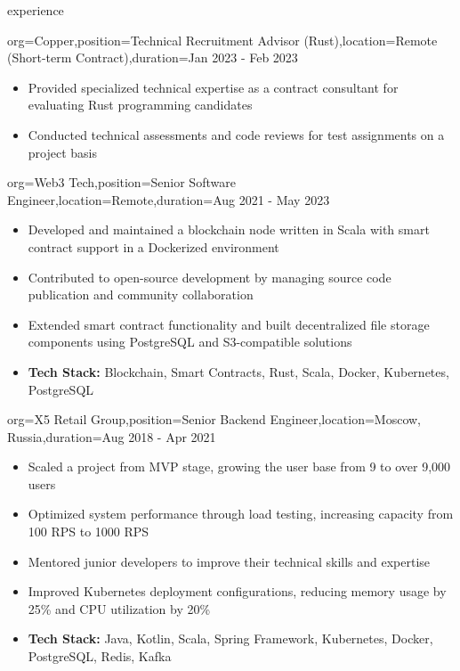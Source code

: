 \documentclass{resume}
\begin{document}
\begin{ResumeSection}{experience}
    \begin{ResumeSubsection}{org=Copper,position=Technical Recruitment Advisor (Rust),location=Remote (Short-term Contract),duration=Jan 2023 - Feb 2023}
        \begin{itemize}
            \item Provided specialized technical expertise as a contract consultant for evaluating Rust programming candidates
            \item Conducted technical assessments and code reviews for test assignments on a project basis
        \end{itemize}
    \end{ResumeSubsection}

    \begin{ResumeSubsection}{org=Web3 Tech,position=Senior Software Engineer,location=Remote,duration=Aug 2021 - May 2023}
    \begin{itemize}
        \item Developed and maintained a blockchain node written in Scala with smart contract support in a Dockerized environment
        \item Contributed to open-source development by managing source code publication and community collaboration
        \item Extended smart contract functionality and built decentralized file storage components using PostgreSQL and S3-compatible solutions
        \item \textbf{Tech Stack:} Blockchain, Smart Contracts, Rust, Scala, Docker, Kubernetes, PostgreSQL
    \end{itemize}
\end{ResumeSubsection}

\begin{ResumeSubsection}{org=X5 Retail Group,position=Senior Backend Engineer,location={Moscow, Russia},duration=Aug 2018 - Apr 2021}
    \begin{itemize}
        \item Scaled a project from MVP stage, growing the user base from 9 to over 9,000 users
        \item Optimized system performance through load testing, increasing capacity from 100 RPS to 1000 RPS
        \item Mentored junior developers to improve their technical skills and expertise
        \item Improved Kubernetes deployment configurations, reducing memory usage by 25\% and CPU utilization by 20\%
        \item \textbf{Tech Stack:} Java, Kotlin, Scala, Spring Framework, Kubernetes, Docker, PostgreSQL, Redis, Kafka
    \end{itemize}
\end{ResumeSubsection}


\end{ResumeSection}
\end{document}
